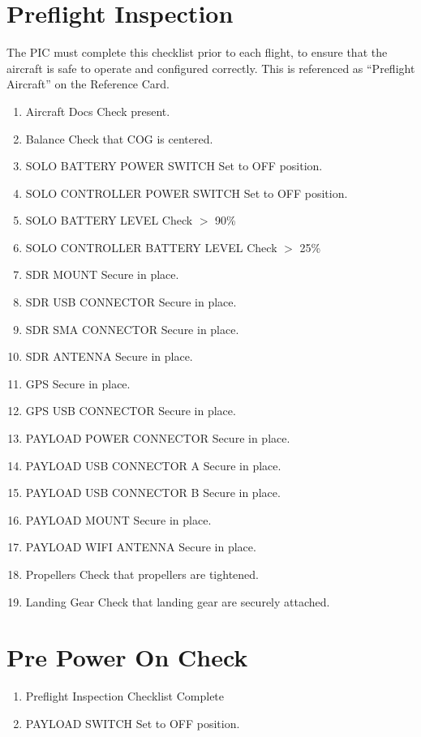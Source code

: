 \documentclass{report}
\begin{document}
	\section{Preflight Inspection}
		The \gls{PIC} must complete this checklist prior to each flight, to ensure that the aircraft is safe to operate and configured correctly.  This is referenced as ``Preflight Aircraft'' on the Reference Card.
		\begin{enumerate}
			\item Aircraft Docs \hrulefill Check present.
			\item Balance \hrulefill Check that \gls{COG} is centered.
			\item SOLO BATTERY POWER SWITCH \hrulefill Set to OFF position.
			\item SOLO CONTROLLER POWER SWITCH \hrulefill Set to OFF position.
			\item SOLO BATTERY LEVEL \hrulefill Check $>$ 90\%
			\item SOLO CONTROLLER BATTERY LEVEL \hrulefill Check $>$ 25\%
			\item SDR MOUNT \hrulefill Secure in place.
			\item SDR USB CONNECTOR \hrulefill Secure in place.
			\item SDR SMA CONNECTOR \hrulefill Secure in place.
			\item SDR ANTENNA \hrulefill Secure in place.
			\item GPS \hrulefill Secure in place.
			\item GPS USB CONNECTOR \hrulefill Secure in place.
			\item PAYLOAD POWER CONNECTOR \hrulefill Secure in place.
			\item PAYLOAD USB CONNECTOR A \hrulefill Secure in place.
			\item PAYLOAD USB CONNECTOR B \hrulefill Secure in place.
			\item PAYLOAD MOUNT \hrulefill Secure in place.
			\item PAYLOAD WIFI ANTENNA \hrulefill Secure in place.
			\item Propellers \hrulefill Check that propellers are tightened.
			\item Landing Gear \hrulefill Check that landing gear are securely attached.
		\end{enumerate}
	\section{Pre Power On Check}
		\begin{enumerate}
			\item Preflight Inspection Checklist \hrulefill Complete
			\item PAYLOAD SWITCH \hrulefill Set to OFF position.
		\end{enumerate}
\end{document}
